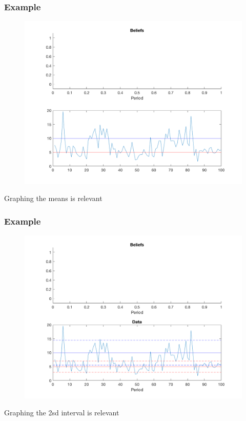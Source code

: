 \documentclass{beamer}
\begin{document}
\begin{frame}
\frametitle[alignment=center]{Example}
\begin{figure}
\centering
\includegraphics[scale=0.5]{Markov2.png}
\end{figure}
Graphing the means is relevant
\end{frame}

\begin{frame}
\frametitle[alignment=center]{Example}
\begin{figure}
\centering
\includegraphics[scale=0.5]{Markov3.png}
\end{figure}
Graphing the 2sd interval is relevant
\end{frame}
\end{document}
